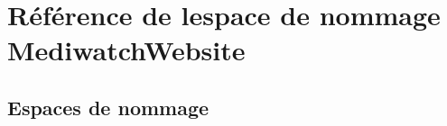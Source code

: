 \hypertarget{namespace_mediwatch_website}{}\section{Référence de l\textquotesingle{}espace de nommage Mediwatch\+Website}
\label{namespace_mediwatch_website}
\subsection*{Espaces de nommage}
\begin{DoxyCompactItemize}
\end{DoxyCompactItemize}
